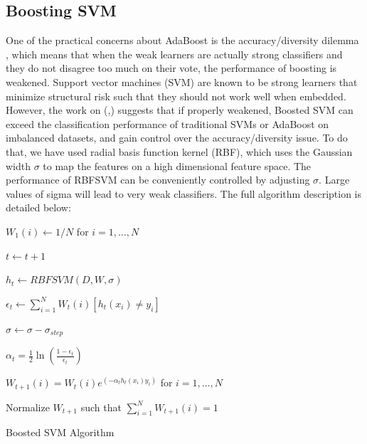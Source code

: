 \documentclass[conference]{IEEEtran}
\begin{document}
\subsection{Boosting SVM}
One of the practical concerns about AdaBoost is the accuracy/diversity dilemma \cite{study_boosted_svm}, which means that when the weak learners are actually strong classifiers and they do not disagree too much on their vote, the performance of boosting is weakened. Support vector machines (SVM) are known to be strong learners that minimize structural risk such that they should not work well when embedded. However, the work on (\cite{study_boosted_svm},\cite{boosting_svm}) suggests that if properly weakened, Boosted SVM can exceed the classification performance of traditional SVMs or AdaBoost on imbalanced datasets, and gain control over the accuracy/diversity issue. To do that, we have used radial basis function kernel (RBF), which uses the Gaussian width $\sigma$ to map the features on a high dimensional feature space. The performance of RBFSVM can be conveniently controlled by adjusting $\sigma$. Large values of sigma will lead to very weak classifiers. The full algorithm description is detailed below:

\begin{algorithm}
  
  $W_1(i) \leftarrow 1/N$ for $i=1,\dots,N$ %
  
    {
        $t \leftarrow t+1$
        
        $h_t \leftarrow RBFSVM(D,W,\sigma)$ 
        
        $\epsilon_t \leftarrow \sum^N_{i=1}W_t(i)[h_t(x_i)\neq y_i]$
        
        		{
		
		$\sigma \leftarrow \sigma - \sigma_{step}$
		
		}
	\Else
	{
	$\alpha_t = \frac{1}{2}\ln \left( \frac{1-\epsilon_t}{\epsilon_t} \right)$
	
	  
	 $W_{t+1}(i) = W_t(i) e^{(-\alpha_th_t(x_i)y_i)}$ for $i=1,\dots,N$
	 
	 Normalize $W_{t+1}$ such that $\sum^N_{i=1}W_{t+1}(i)=1$
	 }
    }
\caption{Boosted SVM Algorithm}
\end{algorithm}
\end{document}
